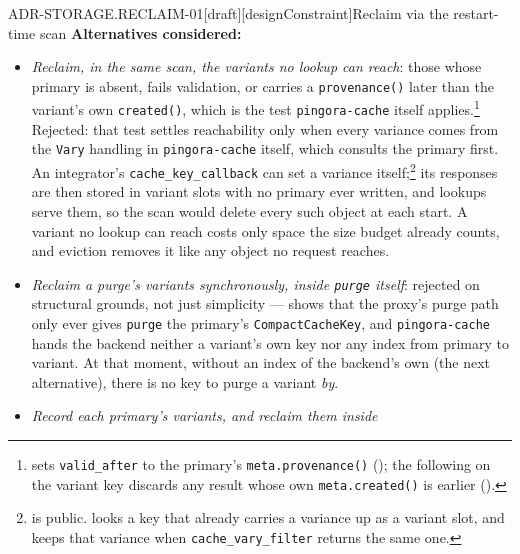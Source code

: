 \begin{requirement}{ADR-STORAGE.RECLAIM-01}[draft][designConstraint]{Reclaim via the restart-time scan}
  \textbf{Alternatives considered:}
  \begin{itemize}
    \item \emph{Reclaim, in the same scan, the variants no lookup can
      reach}: those whose primary is absent, fails validation, or carries a
      \texttt{provenance()} later than the variant's own \texttt{created()},
      which is the test \texttt{pingora-cache} itself
      applies.\footnote{
      sets \texttt{valid\_after} to the primary's \texttt{meta.provenance()}
      (); the following
       on the
      variant key discards any result whose own \texttt{meta.created()} is
      earlier ().} Rejected:
      that test settles reachability only when every variance comes from
      the \texttt{Vary} handling in \texttt{pingora-cache} itself, which consults the
      primary first. An integrator's \texttt{cache\_key\_callback} can set a
      variance
      itself;\footnote{
      is public.
      looks a key that already carries a variance up as a variant slot, and
      keeps that variance when \texttt{cache\_vary\_filter} returns the same
      one.} its responses are then stored in variant slots with no primary
      ever written, and lookups serve them, so the scan would delete every
      such object at each start. A variant no lookup can reach costs only
      space the size budget already counts, and eviction removes it like any
      object no request reaches.
    \item \emph{Reclaim a purge's variants synchronously, inside
      \texttt{purge} itself}: rejected on structural grounds, not just
      simplicity ---  shows that the proxy's
      purge path only ever gives \texttt{purge} the primary's
      \texttt{CompactCacheKey}, and \texttt{pingora-cache} hands the backend
      neither a variant's own key nor any index from primary to variant. At
      that moment, without an index of the backend's own (the next
      alternative), there is no key to purge a variant \emph{by}.
    \item \emph{Record each primary's variants, and reclaim them inside
}
\end{itemize}
\end{requirement}
